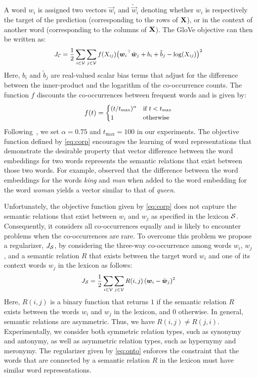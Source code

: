 \documentclass[letterpaper]{article}
\newcommand{\citet}[1]{\citeauthor{#1} \shortcite{#1}}
\begin{document}
A word $w_i$ is assigned two vectors $\vec{w}_i$ and $\tilde{\vec{w}}_i$ denoting whether $w_i$ is respectively
the target of the prediction  (corresponding to the rows of $\text{\bf X}$),
or in the context of another word (corresponding to the columns of $\text{\bf X}$).
The GloVe objective can then be written as:
\begin{equation}
\small
\label{eq:corp}
J_{\mathcal{C}} = \frac{1}{2} \sum_{i \in \mathcal{V}} \sum_{j \in \mathcal{V}} f(X_{ij}) {\left(\boldsymbol{w}_i{}^\top\tilde{\boldsymbol{w}}_j +b_i + \tilde{b}_j  - \log(X_{ij}) \right)}^2
\end{equation}
Here, $b_i$ and $\tilde{b}_j$ are real-valued scalar bias terms that adjust for
the difference between the inner-product and the logarithm of
the co-occurrence counts.
The function $f$ discounts the co-occurrences between frequent words and is given by:
\begin{equation}
\small
f(t) = \begin{cases} (t/t_{\max})^\alpha & \text{if $t < t_{\max}$} \\
1 & \text{otherwise}
\end{cases}
\end{equation}
Following~\cite{Pennington:EMNLP:2014}, we set $\alpha = 0.75$ and $t_{\max} = 100$ in our experiments.
The objective function defined by \eqref{eq:corp} encourages the learning of word representations that demonstrate the
desirable property that vector difference between the word embeddings for two words represents the semantic relations
that exist between those two words. For example, \citet{Mikolov:NAACL:2013} observed that
the difference between the word embeddings for the words \emph{king} and \emph{man} when added to the word embedding
for the word \emph{woman} yields a vector similar to that of \emph{queen}.

Unfortunately, the objective function given by \eqref{eq:corp} does not capture the semantic relations that exist between $w_i$ and $w_j$
as specified in the lexicon $\mathcal{S}$. Consequently, it considers all co-occurrences equally and is likely to encounter problems when the
co-occurrences are rare.
To overcome this problem we propose a regularizer, $J_{\mathcal{S}}$,  by considering the three-way co-occurrence
among words $w_i$, $w_j$, and a semantic relation $R$ that exists between the target word $w_i$ and
one of its context words $w_j$ in the lexicon as follows:
\begin{equation}
\small
\label{eq:onto}
J_{\mathcal{S}} = \frac{1}{2} \sum_{i \in \mathcal{V}}  \sum_{j \in \mathcal{V}} R(i,j) \left(\boldsymbol{w}_i - \tilde{\boldsymbol{w}}_j \right)^2
\end{equation}
Here, $R(i,j)$ is a binary function that returns $1$ if  the semantic relation $R$ exists between the words $w_i$ and $w_j$
in the lexicon, and $0$ otherwise.
In general, semantic relations are asymmetric. Thus, we have $R(i,j) \neq R(j,i)$.
Experimentally, we consider both symmetric relation types, such as synonymy and antonymy, as well as
asymmetric relation types, such as hypernymy and meronymy.
The regularizer given by \eqref{eq:onto} enforces the constraint that the words that are connected by a semantic relation $R$ in the
lexicon must have similar word representations.
\end{document}
